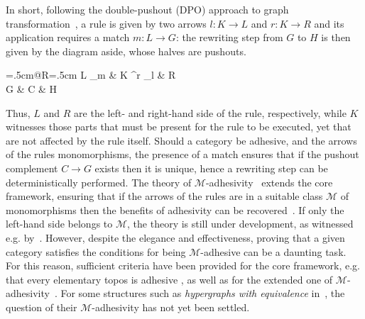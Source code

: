 \documentclass[a4paper,UKenglish,cleveref,pdftex,amsthm,thm-restate,numberwithinsect]{cas-sc}
\theoremstyle{plain}
\theoremstyle{definition}
\begin{document}
\vspace{.1cm}
\noindent
\begin{minipage}[l]{.78\linewidth}In short, following the double-pushout (DPO) approach
to graph transformation~\cite{CorradiniMREHL97,ehrig2006fundamentals}, 
a rule is given by two arrows $l: K \to L$ and $r: K \rightarrow R$
and its application requires a match $m: L \to G$: the rewriting step from $G$
to $H$ is then given by the diagram aside, whose halves are pushouts.
  \end{minipage}%
    \hfill
  \begin{minipage}[r]{.20\linewidth }
    \xymatrix@C=.5cm@R=.5cm{
      L \ar[d]_{m}
      & K \ar[r]^r \ar[l]_{l} \ar[d] & R \ar [d] \\
      G & C \ar[r] \ar[l]                    & H
    }
  \end{minipage}
\vspace{.1cm}

\noindent
Thus, $L$ and $R$ are the left- and right-hand side of the rule, respectively, while $K$ witnesses those parts that must 
be present for the rule to be executed, yet that are not affected by the rule itself.
%
Should a category be adhesive, and the arrows of the rules monomorphisms, the presence of a match ensures that
if the pushout complement $C \to G$ exists then it is unique, hence a rewriting step can be deterministically performed.
%
The theory of $\mathcal{M}$-adhesivity~\cite{azzi2019essence,heindel2009category} extends the core framework, ensuring that if the arrows 
of the rules are in a suitable class $\mathcal{M}$ of monomorphisms
then the benefits of adhesivity
can be recovered~\cite{ehrig2012,ehrig2014adhesive}. 
If only the left-hand side belongs to $\mathcal{M}$, the theory is still under development, as witnessed e.g.
by~\cite{BaldanC0G24}.
%
However, despite the elegance and effectiveness,
proving that a given category satisfies the conditions 
for being $\mathcal{M}$-adhesive can be a daunting task. For this reason, sufficient criteria have been provided for the core 
framework, e.g. that every elementary topos is adhesive \cite{lack2006toposes}, as well as for the extended one of
$\mathcal{M}$-adhesivity~\cite{CastelnovoGM24}.
%
For some structures such as \emph{hypergraphs with equivalence} in~\cite{concur2006}, the question 
of their $\mathcal{M}$-adhesivity has not yet been settled.
\end{document}
